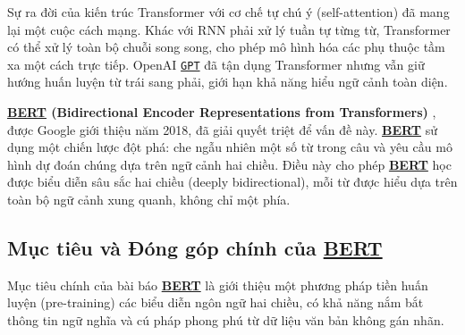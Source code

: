 Sự ra đời của kiến trúc Transformer \cite{vaswani2017attention} với cơ chế tự chú ý (self-attention) đã mang lại một cuộc cách mạng.
Khác với RNN phải xử lý tuần tự từng từ, Transformer có thể xử lý toàn bộ chuỗi song song, cho phép mô hình hóa các phụ thuộc tầm xa một cách trực tiếp.
OpenAI \hyperref[acro:gpt]{\texttt{GPT}} \cite{radford2018improving} đã tận dụng Transformer nhưng vẫn giữ hướng huấn luyện từ trái sang phải, giới hạn khả năng hiểu ngữ cảnh toàn diện.

\textbf{\hyperref[acro:bert]{\textbf{BERT}} (Bidirectional Encoder Representations from Transformers)} \cite{devlin2018bert}, được Google giới thiệu năm 2018, đã giải quyết triệt để vấn đề này.
\hyperref[acro:bert]{\textbf{BERT}} sử dụng một chiến lược đột phá: che ngẫu nhiên một số từ trong câu và yêu cầu mô hình dự đoán chúng dựa trên ngữ cảnh hai chiều.
Điều này cho phép \hyperref[acro:bert]{\textbf{BERT}} học được biểu diễn sâu sắc hai chiều (deeply bidirectional), mỗi từ được hiểu dựa trên toàn bộ ngữ cảnh xung quanh, không chỉ một phía.

\subsection{Mục tiêu và Đóng góp chính của \hyperref[acro:bert]{\textbf{BERT}}}
\label{ssec:muc_tieu_dong_gop_bert}
Mục tiêu chính của bài báo \hyperref[acro:bert]{\textbf{BERT}} \cite{devlin2018bert} là giới thiệu một phương pháp tiền huấn luyện (pre-training) các biểu diễn ngôn ngữ hai chiều, có khả năng nắm bắt thông tin ngữ nghĩa và cú pháp phong phú từ dữ liệu văn bản không gán nhãn.

